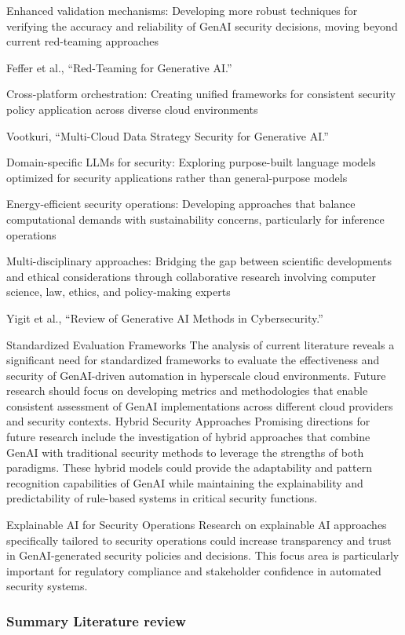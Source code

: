 Enhanced validation mechanisms: Developing more robust techniques for verifying the accuracy and reliability of GenAI security decisions, moving beyond current red-teaming approaches

Feffer et al., “Red-Teaming for Generative AI.”

Cross-platform orchestration: Creating unified frameworks for consistent security policy application across diverse cloud environments

Vootkuri, “Multi-Cloud Data Strategy Security for Generative AI.”

Domain-specific LLMs for security: Exploring purpose-built language models optimized for security applications rather than general-purpose models

Energy-efficient security operations: Developing approaches that balance computational demands with sustainability concerns, particularly for inference operations

Multi-disciplinary approaches: Bridging the gap between scientific developments and ethical considerations through collaborative research involving computer science, law, ethics, and policy-making experts

Yigit et al., “Review of Generative AI Methods in Cybersecurity.”

Standardized Evaluation Frameworks
The analysis of current literature reveals a significant need for standardized frameworks to evaluate the effectiveness and security of GenAI-driven automation in hyperscale cloud environments. Future research should focus on developing metrics and methodologies that enable consistent assessment of GenAI implementations across different cloud providers and security contexts.
Hybrid Security Approaches
Promising directions for future research include the investigation of hybrid approaches that combine GenAI with traditional security methods to leverage the strengths of both paradigms. These hybrid models could provide the adaptability and pattern recognition capabilities of GenAI while maintaining the explainability and predictability of rule-based systems in critical security functions.

Explainable AI for Security Operations
Research on explainable AI approaches specifically tailored to security operations could increase transparency and trust in GenAI-generated security policies and decisions. This focus area is particularly important for regulatory compliance and stakeholder confidence in automated security systems.

\subsubsection{Summary Literature review} %
\label{sec:Summary Literature review}


